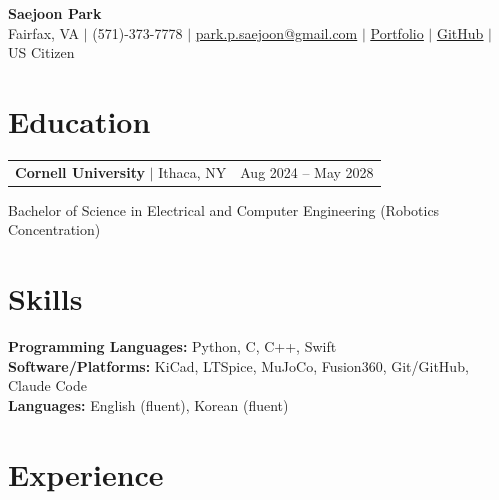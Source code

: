 \documentclass[letterpaper,10pt]{article}
\makeatletter
\newcommand{\bluelink}[2]{\href{#1}{\textcolor{linkblue}{\underline{#2}}}}
\newcommand{\entry}[3]{%
  \begin{tabularx}{\textwidth}{@{}X r@{}}
    \textbf{#1}#2 & #3
  \end{tabularx}\par
}
\makeatother
\begin{document}
\begin{center}
  {\LARGE\bfseries Saejoon Park}\\[3pt]
  Fairfax, VA $|$ (571)-373-7778 $|$
  \href{mailto:park.p.saejoon@gmail.com}{park.p.saejoon@gmail.com} $|$
  \bluelink{https://joonsjpk.github.io/PersonalWebsite/}{Portfolio} $|$
  \bluelink{https://github.com/JoonSJPK}{GitHub} $|$ US Citizen
\end{center}
\vspace{-4pt}

\section{Education}
\entry{Cornell University}{ $|$ Ithaca, NY}{Aug 2024 -- May 2028}
Bachelor of Science in Electrical and Computer Engineering (Robotics Concentration)

\section{Skills}
\textbf{Programming Languages:} Python, C, C++, Swift\\
\textbf{Software/Platforms:} KiCad, LTSpice, MuJoCo, Fusion360, Git/GitHub, Claude Code\\
\textbf{Languages:} English (fluent), Korean (fluent)

\section{Experience}
\end{document}
